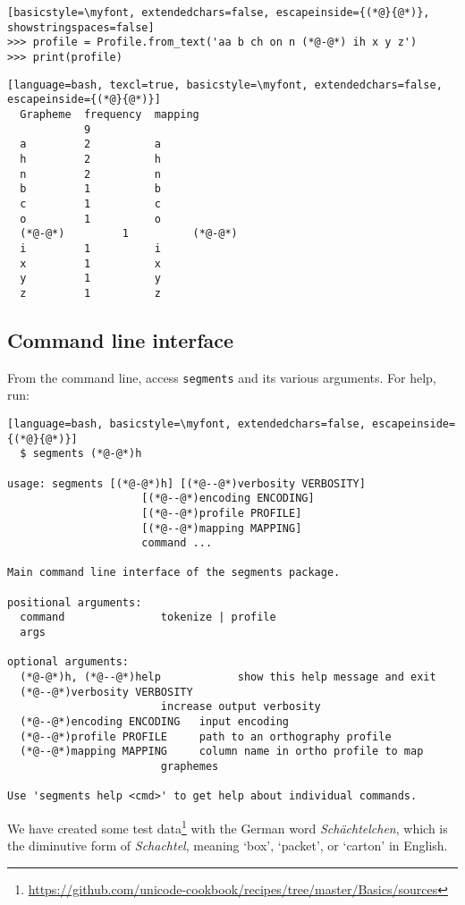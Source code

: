\documentclass[output=book,nonflat,modfonts,
citecolor=brown,
		]{langsci/langscibook}\usepackage[]{graphicx}\usepackage[]{color}
\begin{document}
\begin{lstlisting}[basicstyle=\myfont, extendedchars=false, escapeinside={(*@}{@*)}, showstringspaces=false]
>>> profile = Profile.from_text('aa b ch on n (*@-@*) ih x y z')
>>> print(profile)
\end{lstlisting}


\begin{lstlisting}[language=bash, texcl=true, basicstyle=\myfont, extendedchars=false, escapeinside={(*@}{@*)}]
  Grapheme  frequency  mapping
            9
  a         2          a
  h         2          h
  n         2          n
  b         1          b
  c         1          c
  o         1          o
  (*@-@*)         1          (*@-@*)
  i         1          i
  x         1          x
  y         1          y
  z         1          z
\end{lstlisting}


\subsection*{Command line interface}

From the command line, access \texttt{segments} and its 
various arguments. For help, run:

\begin{lstlisting}[language=bash, basicstyle=\myfont, extendedchars=false, escapeinside={(*@}{@*)}]
  $ segments (*@-@*)h

usage: segments [(*@-@*)h] [(*@--@*)verbosity VERBOSITY] 
                     [(*@--@*)encoding ENCODING]
                     [(*@--@*)profile PROFILE]
                     [(*@--@*)mapping MAPPING]
                     command ...

Main command line interface of the segments package.

positional arguments:
  command               tokenize | profile
  args

optional arguments:
  (*@-@*)h, (*@--@*)help            show this help message and exit
  (*@--@*)verbosity VERBOSITY
                        increase output verbosity
  (*@--@*)encoding ENCODING   input encoding
  (*@--@*)profile PROFILE     path to an orthography profile
  (*@--@*)mapping MAPPING     column name in ortho profile to map 
                        graphemes

Use 'segments help <cmd>' to get help about individual commands.  
\end{lstlisting}

\noindent We have created some test data\footnote{\url{https://github.com/unicode-cookbook/recipes/tree/master/Basics/sources}} with the German word \textit{Schächtelchen}, which is the diminutive form of \textit{Schachtel}, meaning `box', `packet', or `carton' in English.
\end{document}
